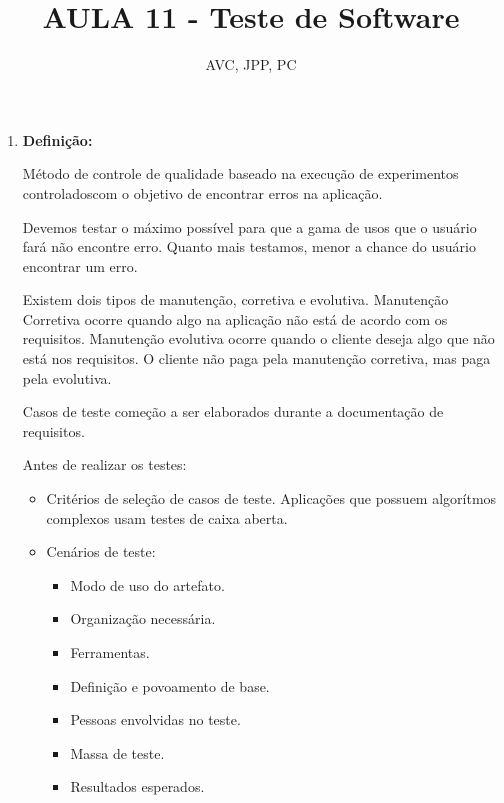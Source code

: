 \documentclass[
	12pt, %
]{fphw}
\title{AULA 11 - Teste de Software} %
\author{AVC, JPP, PC} %
\date{} %
\institute{Pontifícia Universidade Católica do Rio de Janeiro \\ Departamento de Informática} %
\begin{document}
\maketitle %

\begin{doublespace}

    \begin{enumerate}[label=\textbf{\arabic*)}]

        \item \textbf{Definição:}

              Método de controle de qualidade baseado na execução de experimentos controladoscom o objetivo de encontrar erros na aplicação.

              Devemos testar o máximo possível para que a gama de usos que o usuário fará não encontre erro. Quanto mais testamos, menor a chance do usuário encontrar um erro.

              Existem dois tipos de manutenção, corretiva e evolutiva. Manutenção Corretiva ocorre quando algo na aplicação não está de acordo com os requisitos. Manutenção evolutiva ocorre quando o cliente deseja algo que não está nos requisitos. O cliente não paga pela manutenção corretiva, mas paga pela evolutiva.

              Casos de teste começão a ser elaborados durante a documentação de requisitos.

              Antes de realizar os testes:

              \begin{itemize}
                  \item Critérios de seleção de casos de teste. Aplicações que possuem algorítmos complexos usam testes de caixa aberta.
                  \item Cenários de teste:
                        \begin{itemize}
                            \item Modo de uso do artefato.
                            \item Organização necessária.
                            \item Ferramentas.
                            \item Definição e povoamento de base.
                            \item Pessoas envolvidas no teste.
                            \item Massa de teste.
                            \item Resultados esperados.
                        \end{itemize}


\end{itemize}
\end{enumerate}
\end{doublespace}
\end{document}
